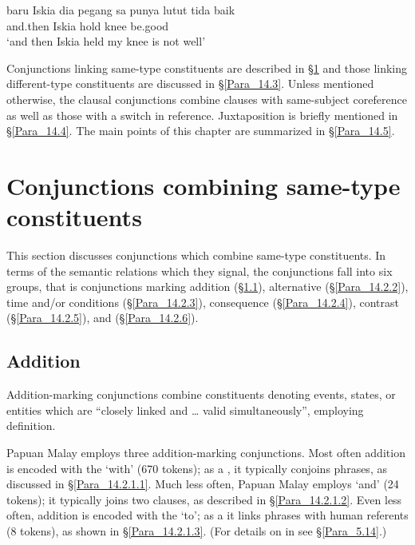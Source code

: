 \ea
\label{Example_14.5}
\gll  baru Iskia dia pegang sa punya lutut  tida baik\\  
 and.then Iskia  hold   knee   be.good\\
\glt ‘and then Iskia held my knee  is not well’ \textstyleExampleSource{[080916-001-CvNP.0003]}
\z

\newpage
Conjunctions linking same-type constituents are described in §\ref{Para_14.2} and those linking different-type constituents are discussed in §\ref{Para_14.3}. Unless mentioned otherwise, the clausal conjunctions combine clauses with same-subject coreference as well as those with a switch in reference. Juxtaposition is briefly mentioned in §\ref{Para_14.4}. The main points of this chapter are summarized in §\ref{Para_14.5}.

\section{Conjunctions combining same-type constituents}
\label{Para_14.2}
This section discusses conjunctions which combine same-type constituents. In terms of the semantic relations which they signal, the conjunctions fall into six groups, that is conjunctions marking addition (§\ref{Para_14.2.1}), alternative (§\ref{Para_14.2.2}), time and/or conditions (§\ref{Para_14.2.3}), consequence (§\ref{Para_14.2.4}), contrast (§\ref{Para_14.2.5}), and  (§\ref{Para_14.2.6}).


\subsection{Addition}
\label{Para_14.2.1}
Addition-marking conjunctions combine constituents denoting events, states, or entities which are “closely linked and {\ldots} valid simultaneously”, employing   definition.



Papuan Malay employs three addition-marking conjunctions. Most often addition is encoded with the    ‘with’ (670 tokens); as a , it typically conjoins  phrases, as discussed in §\ref{Para_14.2.1.1}. Much less often, Papuan Malay employs   ‘and’ (24 tokens); it typically joins two clauses, as described in §\ref{Para_14.2.1.2}. Even less often, addition is encoded with the    ‘to’; as a  it links  phrases with human referents (8 tokens), as shown in §\ref{Para_14.2.1.3}. (For details on  in  see §\ref{Para_5.14}.)
%

